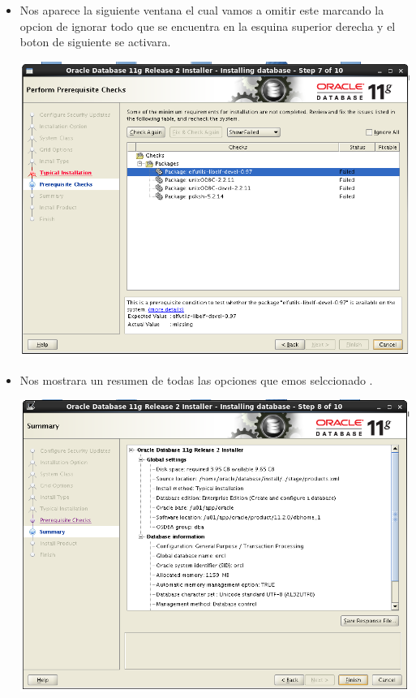 \begin{itemize}
	
\newpage

	\item Nos aparece la siguiente ventana el cual vamos a omitir este marcando la opcion de ignorar todo que se encuentra en la esquina superior derecha y el boton de siguiente se activara.
	\begin{center}
	\includegraphics[width=13cm]{./Imagenes/img53} 
	\end{center}
	
	\item Nos mostrara un resumen de todas las opciones que emos selccionado .
	\begin{center}
	\includegraphics[width=13cm]{./Imagenes/img54} 
	\end{center}
	

\end{itemize}

